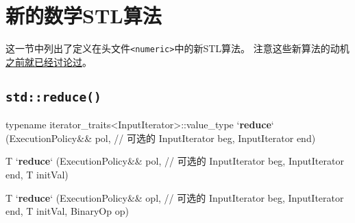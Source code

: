 \section{新的数学STL算法}
这一节中列出了定义在头文件\texttt{<numeric>}中的新STL算法。
注意这些新算法的动机\hyperref[ch22.6]{之前就已经讨论过}。

\subsection{\texttt{std::reduce()}}\label{ch23.2.1}
\begin{blacklisting}
typename iterator_traits<InputIterator>::value_type
`\textbf{reduce}` (ExecutionPolicy&& pol,   // 可选的
        InputIterator beg, InputIterator end)

T
`\textbf{reduce}` (ExecutionPolicy&& pol,   // 可选的
        InputIterator beg, InputIterator end,
        T initVal)

T
`\textbf{reduce}` (ExecutionPolicy&& opl,   // 可选的
        InputIterator beg, InputIterator end,
        T initVal,
        BinaryOp op)
\end{blacklisting}
